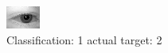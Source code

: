 \begin{figure}[h!]
\begin{center}
\includegraphics[width=0.60\columnwidth]{figures/ID431_class_1_target_2.png}
\end{center}
\caption{ Classification: 1 actual target: 2}
\label{fig:ID431_class_1_target_2}
\end{figure}
